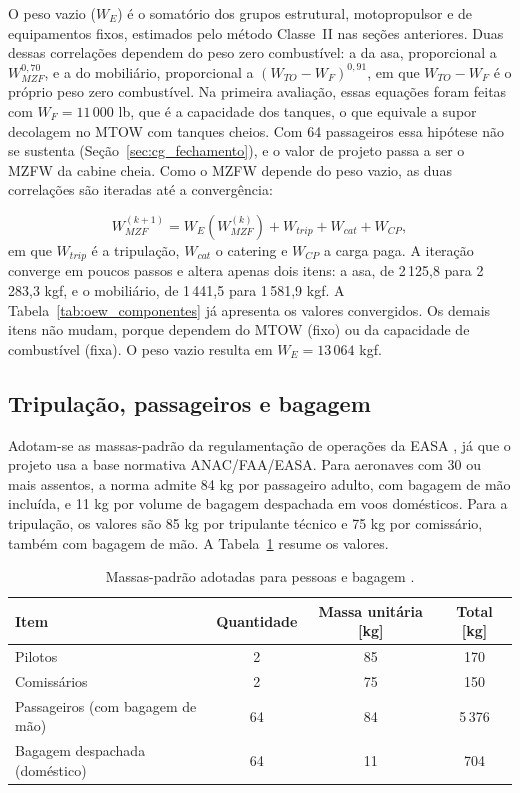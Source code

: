 \label{sec:cg_pesovazio}
O peso vazio ($W_E$) é o somatório dos grupos estrutural, motopropulsor e de equipamentos fixos, estimados pelo método Classe~II nas seções anteriores. Duas dessas correlações dependem do peso zero combustível: a da asa, proporcional a $W_{MZF}^{0,70}$, e a do mobiliário, proporcional a $(W_{TO}-W_F)^{0,91}$, em que $W_{TO}-W_F$ é o próprio peso zero combustível. Na primeira avaliação, essas equações foram feitas com $W_F = 11\,000$ lb, que é a capacidade dos tanques, o que equivale a supor decolagem no MTOW com tanques cheios. Com 64 passageiros essa hipótese não se sustenta (Seção~\ref{sec:cg_fechamento}), e o valor de projeto passa a ser o MZFW da cabine cheia. Como o MZFW depende do peso vazio, as duas correlações são iteradas até a convergência:

\begin{equation}
W_{MZF}^{(k+1)} = W_E\!\left(W_{MZF}^{(k)}\right) + W_{trip} + W_{cat} + W_{CP},
\label{eq:cg_iteracao}
\end{equation}
em que $W_{trip}$ é a tripulação, $W_{cat}$ o catering e $W_{CP}$ a carga paga. A iteração converge em poucos passos e altera apenas dois itens: a asa, de 2\,125,8 para 2\,283,3 kgf, e o mobiliário, de 1\,441,5 para 1\,581,9 kgf. A Tabela~\ref{tab:oew_componentes} já apresenta os valores convergidos. Os demais itens não mudam, porque dependem do MTOW (fixo) ou da capacidade de combustível (fixa). O peso vazio resulta em $W_E = 13\,064$ kgf.

\subsection{Tripulação, passageiros e bagagem}
Adotam-se as massas-padrão da regulamentação de operações da EASA \cite{easa_airops}, já que o projeto usa a base normativa ANAC/FAA/EASA. Para aeronaves com 30 ou mais assentos, a norma admite 84 kg por passageiro adulto, com bagagem de mão incluída, e 11 kg por volume de bagagem despachada em voos domésticos. Para a tripulação, os valores são 85 kg por tripulante técnico e 75 kg por comissário, também com bagagem de mão. A Tabela~\ref{tab:cg_massas} resume os valores.

\begin{table}[H]
  \centering
  \linespread{1}\small
  \setlength{\tabcolsep}{4pt}
  \caption{Massas-padrão adotadas para pessoas e bagagem \cite{easa_airops}.}
  \label{tab:cg_massas}
  \begin{tabularx}{\textwidth}{>{\raggedright\arraybackslash}X c c c}
    \toprule
    \textbf{Item} & \textbf{Quantidade} & \textbf{Massa unitária [kg]} & \textbf{Total [kg]} \\
    \midrule
    Pilotos & 2 & 85 & 170 \\
    Comissários & 2 & 75 & 150 \\
    Passageiros (com bagagem de mão) & 64 & 84 & 5\,376 \\
    Bagagem despachada (doméstico) & 64 & 11 & 704 \\
    \bottomrule
  \end{tabularx}
\end{table}

